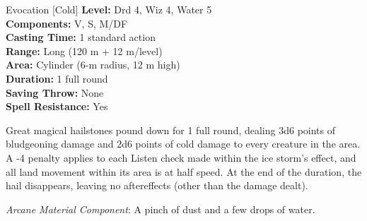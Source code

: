 {Evocation [Cold]}
{
	\textbf{Level:}
	Drd 4, Wiz 4, Water 5\\
	\textbf{Components:}
	V, S, M/DF\\
	\textbf{Casting Time:}
	1 standard action\\
	\textbf{Range:}
	Long (120 m + 12 m/level)\\
	\textbf{Area:}
	Cylinder (6-m radius, 12 m high)\\
	\textbf{Duration:}
	1 full round\\
	\textbf{Saving Throw:}
	None\\
	\textbf{Spell Resistance:}
	Yes\\
}
{
	Great magical hailstones pound down for 1 full round, dealing 3d6 points of bludgeoning damage and 2d6 points of cold damage to every creature in the area. A -4 penalty applies to each Listen check made within the ice storm's effect, and all land movement within its area is at half speed. At the end of the duration, the hail disappears, leaving no aftereffects (other than the damage dealt).

	\textit{Arcane Material Component}:
	A pinch of dust and a few drops of water.

}

